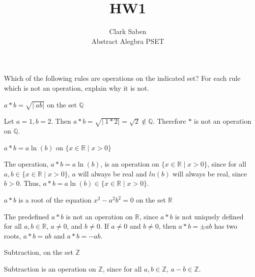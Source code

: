 \documentclass[12pt]{article}
\newenvironment{problem}[2][Problem]{\begin{trivlist}
\item[\hskip \labelsep {\bfseries #1}\hskip \labelsep {\bfseries #2.}]}{\end{trivlist}}
\newenvironment{question}[2][Question]{\begin{trivlist}
\item[\hskip \labelsep {\bfseries #1}\hskip \labelsep {\bfseries #2.}]}{\end{trivlist}}
\begin{document}
 
 
\title{HW1}%
\author{Clark Saben\\ %
Abstract Alegbra PSET} %
 
\maketitle

\begin{problem}{1/1}
	Which of the following rules are operations on the indicated set?
	For each rule which is not an operation, explain why it is not.
\end{problem}

\begin{question}{A1}
	$a*b = \sqrt{\lvert\ ab \rvert}$ on the set $\mathbb{Q}$
\end{question}

	Let $a = 1, b = 2$. Then $a*b = \sqrt{\lvert\ 1*2 \rvert} = \sqrt{2} \notin \mathbb{Q}$. Therefore $*$ is not an operation on $\mathbb{Q}$.

    
\begin{question}{A2}
	$a*b = a\ln(b)$ on $\{x \in \mathbb{R} \mid x > 0\}$
\end{question}

	The operation, $a*b = a\ln(b)$, is an operation on $\{x \in \mathbb{R} \mid x > 0\}$, since for all 
	$a, b \in \{x \in \mathbb{R} \mid x > 0\}$, $a$ will always be real and $ln(b)$ will always be real, since $b > 0$.
	Thus, $a*b = a\ln(b) \in \{x \in \mathbb{R} \mid x > 0\}$.


    
\begin{question}{A3}
	$a*b$ is a root of the equation $x^2 - a^2b^2 = 0$ on the set $\mathbb{R}$
\end{question}

	The predefined $a*b$ is not an operation on $\mathbb{R}$, since $a*b$ is not
	uniquely defined for all $a, b \in \mathbb{R}$, $a \neq 0$, and $b \neq 0$.
	If $a \neq 0$ and $b \neq 0$, then $a*b = \pm ab$ has two roots,
	$a*b = ab$ and $a*b = -ab$.

\begin{question}{A4}
	Subtraction, on the set $\mathbb{Z}$
\end{question}

	Subtraction is an operation on $\mathbb{Z}$, since for all $a, b \in \mathbb{Z}$, $a - b \in \mathbb{Z}$.

 
 
\end{document}
